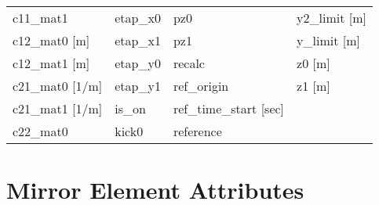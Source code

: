 \begin{tabular}{llll}
c11_mat1                         & etap_x0                          & pz0                              & y2_limit [m]                     \\
c12_mat0 [m]                     & etap_x1                          & pz1                              & y_limit [m]                      \\
c12_mat1 [m]                     & etap_y0                          & recalc                           & z0 [m]                           \\
c21_mat0 [1/m]                   & etap_y1                          & ref_origin                       & z1 [m]                           \\
c21_mat1 [1/m]                   & is_on                            & ref_time_start [sec]             &                                  \\
c22_mat0                         & kick0                            & reference                        &                                  \\
 \bottomrule
 \end{tabular}
 \vfill
 
 \section{Mirror Element Attributes}
 \label{s:list.mirror}
 
